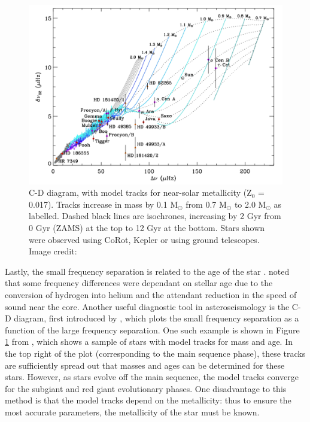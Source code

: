 \begin{figure}[t]
    \centering
    \includegraphics[scale=0.4]{Figures/1-Introduction/C-D_diagram.pdf}
    \caption[C-D diagram used to determine stellar ages]{C-D diagram, with model tracks for near-solar metallicity (Z$_{0}$ = 0.017). Tracks increase in mass by 0.1 M$_{\odot}$ from 0.7 M$_{\odot}$ to 2.0 M$_{\odot}$ as labelled. Dashed black lines are isochrones, increasing by 2 Gyr from 0 Gyr (ZAMS) at the top to 12 Gyr at the bottom. Stars shown were observed using CoRot, Kepler or using ground telescopes. Image credit: \citet{White_etal_2011}}
    \label{fig:CD_diagram_example}
\end{figure}

Lastly, the small frequency separation is related to the age of the star \citep{Ulrich_1986}. \citet{Christensen_Dalsgaard_1984} noted that some frequency differences were dependant on stellar age due to the conversion of hydrogen into helium and the attendant reduction in the speed of sound near the core. Another useful diagnostic tool in asteroseismology is the C-D diagram, first introduced by \citet{Christensen_Dalsgaard_1984}, which plots the small frequency separation as a function of the large frequency separation. One such example is shown in Figure \ref{fig:CD_diagram_example} from \citet{White_etal_2011}, which shows a sample of stars with model tracks for mass and age. In the top right of the plot (corresponding to the main sequence phase), these tracks are sufficiently spread out that masses and ages can be determined for these stars. However, as stars evolve off the main sequence, the model tracks converge for the subgiant and red giant evolutionary phases. One disadvantage to this method is that the model tracks depend on the metallicity: thus to ensure the most accurate parameters, the metallicity of the star must be known.

